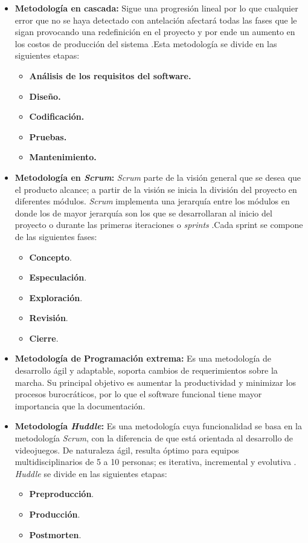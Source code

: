 \begin{itemize}
    \item \textbf{Metodología en cascada:} Sigue una progresión lineal por lo que
    cualquier error que no se haya detectado con antelación afectará todas las
    fases que le sigan provocando una redefinición en el proyecto y por ende un
    aumento en los costos de producción del sistema \cite{Ref:CarCascada}.Esta
    metodología se divide en las siguientes etapas:
        \begin{itemize}
            \item \textbf{Análisis de los requisitos del software.}
            \item \textbf{Diseño.}
            \item \textbf{Codificación.}
            \item \textbf{Pruebas.}
            \item \textbf{Mantenimiento.}
        \end{itemize}
    \item \textbf{Metodología en \textit{Scrum}:} \textit{Scrum} parte de la visión
    general que se desea que el producto alcance; a partir de la visión se inicia la
    división del proyecto en diferentes módulos. \textit{Scrum} implementa una
    jerarquía entre los módulos en donde los de mayor jerarquía son los
    que se desarrollaran al inicio del proyecto o durante las primeras iteraciones
    o \textit{sprints} \cite{Ref_ScrumRef}.Cada sprint se compone de las siguientes
    fases:
    \begin{itemize}
        \item \textbf{Concepto}.
        \item \textbf{Especulación}.
        \item \textbf{Exploración}.
        \item \textbf{Revisión}.
        \item \textbf{Cierre}\cite{Ref_ScrumGuia}.
    \end{itemize}
    \item \textbf{Metodología de Programación extrema:} Es una metodología de
    desarrollo ágil y adaptable, soporta cambios de requerimientos sobre la marcha.
    Su principal objetivo es aumentar la productividad y minimizar los procesos
    burocráticos, por lo que el software funcional tiene mayor importancia que la
    documentación\cite{Ref_XP}.
    \item \textbf{Metodología \textit{Huddle}:} Es una metodología cuya funcionalidad
 se basa en la metodología \textit{Scrum}, con la diferencia de que está orientada al
  desarrollo de videojuegos.  De naturaleza ágil, resulta óptimo para equipos
  multidisciplinarios de 5 a 10 personas; es iterativa, incremental y evolutiva
  \cite{Ref_Huddle}. \textit{Huddle} se divide en las siguientes etapas:
      \begin{itemize}
          \item \textbf{Preproducción}.
        \item \textbf{Producción}.
        \item \textbf{Postmorten}.
      \end{itemize}
\end{itemize}

